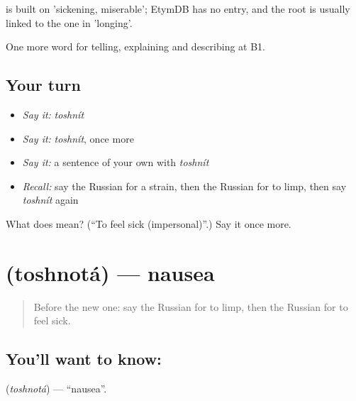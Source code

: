 \begin{cousinweb}
\emph{} is built on \emph{} 'sickening, miserable'; EtymDB has no entry, and the root is usually linked to the one in \emph{} 'longing'.
\end{cousinweb}

\begin{grammarlens}[title={What you've built}]
One more word for telling, explaining and describing at B1.
\end{grammarlens}

\subsection*{Your turn}
\begin{itemize}
\raggedright
  \item \emph{Say it:} \emph{toshnít}
  \item \emph{Say it:} \emph{toshnít}, once more
  \item \emph{Say it:} a sentence of your own with \emph{toshnít}
  \item \emph{Recall:} say the Russian for a strain, then the Russian for to limp, then say \emph{toshnít} again
\end{itemize}

\begin{tcolorbox}[breakable,colback=teal!4,colframe=teal!35!black,title={Before you move on}]
What does  mean? (\textquotedblleft{}To feel sick (impersonal)\textquotedblright{}.) Say it once more.
\end{tcolorbox}
\section[\texorpdfstring{\ru{тошнота} (toshnotá)}{тошнота (toshnotá)}]{ (toshnotá) — nausea}

\label{lesson:RU-C485-toshnota}



\begin{quote}
Before the new one: say the Russian for to limp, then the Russian for to feel sick.
\end{quote}

\subsection*{You'll want to know: }
\textbf{} (\emph{toshnotá}) — \textquotedblleft{}nausea\textquotedblright{}.

